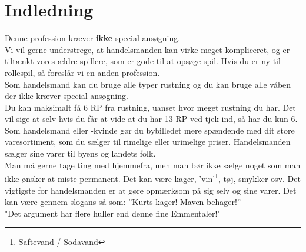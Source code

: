 \chapter{Indledning}
Denne profession kræver \textbf{ikke} special ansøgning.\\

Vi vil gerne understrege, at handelsmanden kan virke meget kompliceret, og er tiltænkt vores ældre spillere, som er gode til at opsøge spil. Hvis du er ny til rollespil, så foreslår vi en anden profession.\\

Som handelsmand kan du bruge alle typer rustning og du kan bruge alle våben der ikke kræver special ansøgning.\\
Du kan maksimalt få 6 RP fra rustning, uanset hvor meget rustning du har. Det vil sige at selv hvis du får at vide at du har 13 RP ved tjek ind, så har du kun 6.\\

Som handelsmand eller -kvinde gør du bybilledet mere spændende med dit store varesortiment, som du sælger til rimelige eller urimelige priser. Handelsmanden sælger sine varer til byens og landets folk.\\
Man må gerne tage ting med hjemmefra, men man bør ikke sælge noget som man ikke ønsker at miste permanent. Det kan være kager, 'vin'\footnote{Saftevand / Sodavand}, tøj, smykker osv. Det vigtigste for handelsmanden er at gøre opmærksom på sig selv og sine varer. Det kan være gennem slogans så som: ”Kurts kager! Maven behager!”\\
"Det argument har flere huller end denne fine Emmentaler!"\\